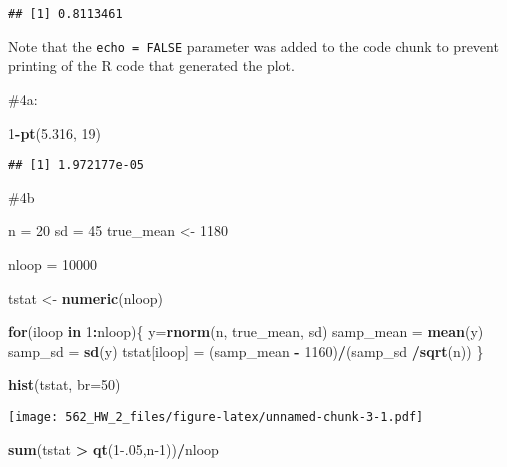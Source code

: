 \documentclass[
]{article}
\newenvironment{Shaded}{\begin{snugshade}}{\end{snugshade}}
\newcommand{\AttributeTok}[1]{\textcolor[rgb]{0.13,0.29,0.53}{#1}}
\newcommand{\ControlFlowTok}[1]{\textcolor[rgb]{0.13,0.29,0.53}{\textbf{#1}}}
\newcommand{\DecValTok}[1]{\textcolor[rgb]{0.00,0.00,0.81}{#1}}
\newcommand{\FloatTok}[1]{\textcolor[rgb]{0.00,0.00,0.81}{#1}}
\newcommand{\FunctionTok}[1]{\textcolor[rgb]{0.13,0.29,0.53}{\textbf{#1}}}
\newcommand{\NormalTok}[1]{#1}
\newcommand{\OtherTok}[1]{\textcolor[rgb]{0.56,0.35,0.01}{#1}}
\newcommand{\SpecialCharTok}[1]{\textcolor[rgb]{0.81,0.36,0.00}{\textbf{#1}}}
\begin{document}
\begin{verbatim}
## [1] 0.8113461
\end{verbatim}

Note that the \texttt{echo\ =\ FALSE} parameter was added to the code
chunk to prevent printing of the R code that generated the plot.

\#4a:

\begin{Shaded}
\begin{Highlighting}[]
\DecValTok{1}\SpecialCharTok{{-}}\FunctionTok{pt}\NormalTok{(}\FloatTok{5.316}\NormalTok{, }\DecValTok{19}\NormalTok{)}
\end{Highlighting}
\end{Shaded}

\begin{verbatim}
## [1] 1.972177e-05
\end{verbatim}

\#4b

\begin{Shaded}
\begin{Highlighting}[]
\NormalTok{n }\OtherTok{=} \DecValTok{20}
\NormalTok{sd }\OtherTok{=} \DecValTok{45}
\NormalTok{true\_mean }\OtherTok{\textless{}{-}} \DecValTok{1180}

\NormalTok{nloop }\OtherTok{=} \DecValTok{10000}

\NormalTok{tstat }\OtherTok{\textless{}{-}} \FunctionTok{numeric}\NormalTok{(nloop)}

\ControlFlowTok{for}\NormalTok{(iloop }\ControlFlowTok{in} \DecValTok{1}\SpecialCharTok{:}\NormalTok{nloop)\{}
\NormalTok{  y}\OtherTok{=}\FunctionTok{rnorm}\NormalTok{(n, true\_mean, sd)}
\NormalTok{  samp\_mean }\OtherTok{=} \FunctionTok{mean}\NormalTok{(y)}
\NormalTok{  samp\_sd }\OtherTok{=} \FunctionTok{sd}\NormalTok{(y)}
\NormalTok{  tstat[iloop] }\OtherTok{=}\NormalTok{ (samp\_mean }\SpecialCharTok{{-}} \DecValTok{1160}\NormalTok{)}\SpecialCharTok{/}\NormalTok{(samp\_sd }\SpecialCharTok{/}\FunctionTok{sqrt}\NormalTok{(n))}
\NormalTok{\}}

\FunctionTok{hist}\NormalTok{(tstat, }\AttributeTok{br=}\DecValTok{50}\NormalTok{)}
\end{Highlighting}
\end{Shaded}

\texttt{[image: 562\_HW\_2\_files/figure-latex/unnamed-chunk-3-1.pdf]}

\begin{Shaded}
\begin{Highlighting}[]
\FunctionTok{sum}\NormalTok{(tstat }\SpecialCharTok{\textgreater{}} \FunctionTok{qt}\NormalTok{(}\DecValTok{1}\FloatTok{{-}.05}\NormalTok{,n}\DecValTok{{-}1}\NormalTok{))}\SpecialCharTok{/}\NormalTok{nloop}
\end{Highlighting}
\end{Shaded}
\end{document}
